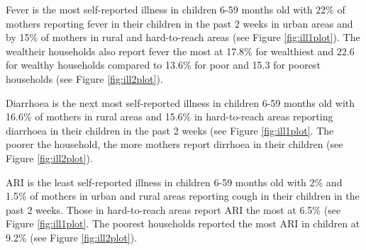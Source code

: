 \documentclass[12pt,a4paper]{article}
\begin{document}
Fever is the most self-reported illness in children 6-59 months old with 22\% of mothers reporting fever in their children in the past 2 weeks in urban areas and by 15\% of mothers in rural and hard-to-reach areas (see Figure \ref{fig:ill1plot}). The wealtheir households also report fever the most at 17.8\% for wealthiest and 22.6 for wealthy households compared to 13.6\% for poor and 15.3 for poorest households (see Figure \ref{fig:ill2plot}).

Diarrhoea is the next most self-reported illness in children 6-59 months old with 16.6\% of mothers in rural areas and 15.6\% in hard-to-reach areas reporting diarrhoea in their children in the past 2 weeks (see Figure \ref{fig:ill1plot}. The poorer the household, the more mothers report dirrhoea in their children (see Figure \ref{fig:ill2plot}).

ARI is the least self-reported illness in children 6-59 months old with 2\% and 1.5\% of mothers in urban and rural areas reporting cough in their children in the past 2 weeks. Those in hard-to-reach areas report ARI the most at 6.5\% (see Figure \ref{fig:ill1plot}. The poorest households reported the most ARI in children at 9.2\% (see Figure \ref{fig:ill2plot}).
\end{document}
